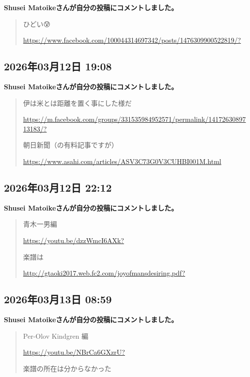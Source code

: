 \textbf{Shusei Matoikeさんが自分の投稿にコメントしました。}

\begin{quote}
ひどい😰

\url{https://www.facebook.com/100044314697342/posts/1476309900522819/?}
\end{quote}

\subsection*{2026年03月12日 19:08}

\textbf{Shusei Matoikeさんが自分の投稿にコメントしました。}

\begin{quote}
伊は米とは距離を置く事にした様だ

\url{https://m.facebook.com/groups/331535984952571/permalink/1417263089713183/?}

朝日新聞（の有料記事ですが）

\url{https://www.asahi.com/articles/ASV3C73G0V3CUHBI001M.html}
\end{quote}

\subsection*{2026年03月12日 22:12}

\textbf{Shusei Matoikeさんが自分の投稿にコメントしました。}

\begin{quote}
青木一男編

\url{https://youtu.be/dzzWmcI6AXk?}

楽譜は

\url{http://gtaoki2017.web.fc2.com/joyofmansdesiring.pdf?}
\end{quote}

\subsection*{2026年03月13日 08:59}

\textbf{Shusei Matoikeさんが自分の投稿にコメントしました。}

\begin{quote}
Per-Olov Kindgren 編

\url{https://youtu.be/NBrCa6GXzrU?}

楽譜の所在は分からなかった
\end{quote}

